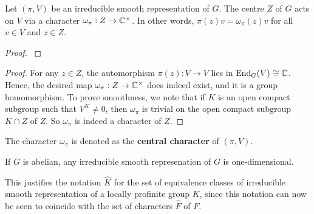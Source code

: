 \begin{cor}
    Let $(\pi,V)$ be an irreducible smooth representation of $G$. The centre $Z$ of $G$ acts on $V$ via a character $\omega_{\pi}:Z\to\mathbb{C}^{\times}$. In other words, $\pi(z)v=\omega_{\pi}(z)v$ for all $v\in V$ and $z\in Z$.
\end{cor}
\begin{proof}
    \cite[2.6 Schur's Lemma]{BH1}
\end{proof}

\begin{proof}
    For any $z\in Z$, the automorphism $\pi(z):V\to V$ lies in $\mathrm{End}_G(V)\cong\mathbb{C}$. Hence, the desired map $\omega_{\pi}:Z\to\mathbb{C}^{\times}$ does indeed exist, and it is a group homomorphism. To prove smoothness, we note that if $K$ is an open compact subgroup such that $V^K\neq 0$, then $\omega_{\pi}$ is trivial on the open compact subgroup $K\cap Z$ of $Z$. So $\omega_{\pi}$ is indeed a character of $Z$.
\end{proof}

The character $\omega_{\pi}$ is denoted as the \textbf{central character} of $(\pi,V)$.

\begin{cor}
    If $G$ is abelian, any irreducible smooth represenation of $G$ is one-dimensional.
\end{cor}

This justifies the notation $\hat{K}$ for the set of equivalence classes of irreducible smooth representation of a locally profinite group $K$, since this notation can now be seen to coincide with the set of characters $\hat{F}$ of $F$.
